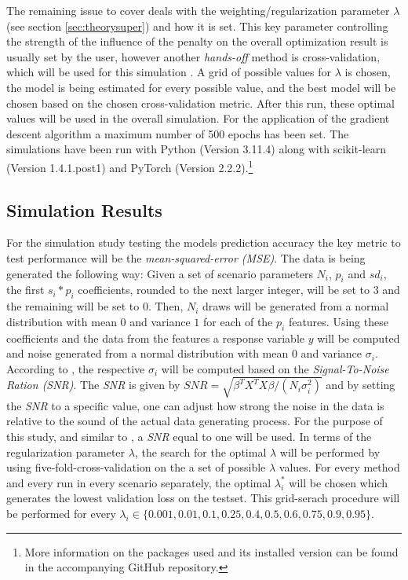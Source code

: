 \documentclass[12pt,a4paper]{article}
\begin{document}
The remaining issue to cover deals with the weighting/regularization parameter $\lambda$ (see section \ref{sec:theorysuper}) and how it is set. This key parameter controlling the strength of the influence of the penalty on the overall optimization result is usually set by the user, however another \textit{hands-off} method is cross-validation, which will be used for this simulation \parencite[250--251]{ESL2009}. A grid of possible values for $\lambda$ is chosen, the model is being estimated for every possible value, and the best model will be chosen based on the chosen cross-validation metric. After this run, these optimal values will be used in the overall simulation. For the application of the gradient descent algorithm a maximum number of 500 epochs has been set. The simulations have been run with Python (Version 3.11.4) along with scikit-learn (Version 1.4.1.post1) and PyTorch (Version 2.2.2).\footnote{More information on the packages used and its installed version can be found in the accompanying GitHub repository.}

\subsection{Simulation Results} 

For the simulation study testing the models prediction accuracy the key metric to test performance will be the \textit{mean-squared-error (MSE)}. The data is being generated the following way: Given a set of scenario parameters $N_i$, $p_i$ and $sd_i$, the first $s_i*p_i$ coefficients, rounded to the next larger integer, will be set to $3$ and the remaining will be set to $0$. Then, $N_i$ draws will be generated from a normal distribution with mean $0$ and variance $1$ for each of the $p_i$ features. Using these coefficients and the data from the features a response variable $y$ will be computed and noise generated from a normal distribution with mean $0$ and variance $\sigma_i$. According to \textcite{WangEtAl2020}, the respective $\sigma_i$ will be computed based on the \textit{Signal-To-Noise Ration (SNR)}. The \textit{SNR} is given by $SNR = \sqrt{\beta^TX^TX\beta/(N_i\sigma_i^2)}$ and by setting the \textit{SNR} to a specific value, one can adjust how strong the noise in the data is relative to the sound of the actual data generating process. For the purpose of this study, and similar to \textcite{WangEtAl2020}, a \textit{SNR} equal to one will be used. In terms of the regularization parameter $\lambda$, the search for the optimal $\lambda$ will be performed by using five-fold-cross-validation on the a set of possible $\lambda$ values. For every method and every run in every scenario separately, the optimal $\lambda^*_i$ will be chosen which generates the lowest validation loss on the testset. This grid-serach procedure will be performed for every $\lambda_i \in \{0.001, 0.01, 0.1, 0.25, 0.4, 0.5, 0.6, 0.75, 0.9, 0.95\}$.\\
\end{document}
